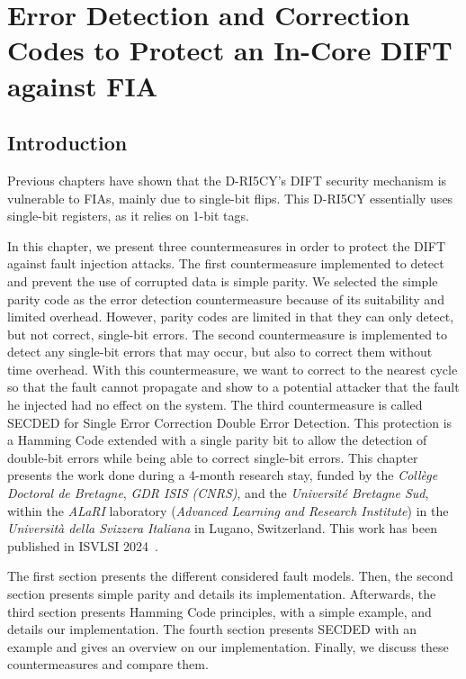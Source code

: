 \chapter{Error Detection and Correction Codes to Protect an In-Core DIFT against FIA}
\label{chapter:countermeasures}
\minitoc

\section{Introduction}
Previous chapters have shown that the D-RI5CY's DIFT security mechanism is vulnerable to FIAs, mainly due to single-bit flips. This D-RI5CY essentially uses single-bit registers, as it relies on 1-bit tags.

In this chapter, we present three countermeasures in order to protect the DIFT against fault injection attacks.
The first countermeasure implemented to detect and prevent the use of corrupted data is simple parity. We selected the simple parity code as the error detection countermeasure because of its suitability and limited overhead. However, parity codes are limited in that they can only detect, but not correct, single-bit errors.
The second countermeasure is implemented to detect any single-bit errors that may occur, but also to correct them without time overhead. With this countermeasure, we want to correct to the nearest cycle so that the fault cannot propagate and show to a potential attacker that the fault he injected had no effect on the system.
The third countermeasure is called SECDED for Single Error Correction Double Error Detection. This protection is a Hamming Code extended with a single parity bit to allow the detection of double-bit errors while being able to correct single-bit errors.
This chapter presents the work done during a 4-month research stay, funded by the \textit{Collège Doctoral de Bretagne}, \textit{GDR ISIS (CNRS)}, and the \textit{Université Bretagne Sud}, within the \textit{ALaRI} laboratory (\textit{Advanced Learning and Research Institute}) in the \textit{Università della Svizzera Italiana} in Lugano, Switzerland.
This work has been published in ISVLSI 2024~\cite{PRLG-24-isvlsi}.

The first section presents the different considered fault models. Then, the second section presents simple parity and details its implementation. Afterwards, the third section presents Hamming Code principles, with a simple example, and details our implementation. The fourth section presents SECDED with an example and gives an overview on our implementation. Finally, we discuss these countermeasures and compare them.


